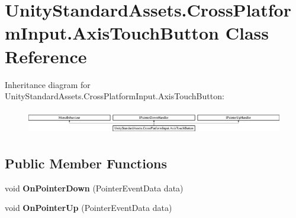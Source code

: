 \hypertarget{class_unity_standard_assets_1_1_cross_platform_input_1_1_axis_touch_button}{}\section{Unity\+Standard\+Assets.\+Cross\+Platform\+Input.\+Axis\+Touch\+Button Class Reference}
\label{class_unity_standard_assets_1_1_cross_platform_input_1_1_axis_touch_button}
Inheritance diagram for Unity\+Standard\+Assets.\+Cross\+Platform\+Input.\+Axis\+Touch\+Button\+:\begin{figure}[H]
\begin{center}
\leavevmode
\includegraphics[height=1.085271cm]{class_unity_standard_assets_1_1_cross_platform_input_1_1_axis_touch_button}
\end{center}
\end{figure}
\subsection*{Public Member Functions}
\begin{DoxyCompactItemize}
\item 
void {\bfseries On\+Pointer\+Down} (Pointer\+Event\+Data data)\hypertarget{class_unity_standard_assets_1_1_cross_platform_input_1_1_axis_touch_button_a854d21df612c905d76e94202de62d7f4}{}\label{class_unity_standard_assets_1_1_cross_platform_input_1_1_axis_touch_button_a854d21df612c905d76e94202de62d7f4}

\item 
void {\bfseries On\+Pointer\+Up} (Pointer\+Event\+Data data)\hypertarget{class_unity_standard_assets_1_1_cross_platform_input_1_1_axis_touch_button_af74585809c7ae2aae9e0ee89fc21b689}{}\label{class_unity_standard_assets_1_1_cross_platform_input_1_1_axis_touch_button_af74585809c7ae2aae9e0ee89fc21b689}

\end{DoxyCompactItemize}
